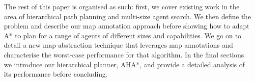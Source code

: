 The rest of this paper is organised as such: first, we cover existing work in the area of hierarchical path planning and multi-size agent search. We then define the problem and describe our map annotation approach before showing how to adapt A* to plan for a range of agents of different sizes and capabilities. We go on to detail a new map abstraction technique that leverages map annotations and characterise the worst-case performance for that algorithm. In the final sections we introduce our hierarchical planner, AHA*, and provide a detailed analysis of its performance before concluding.
